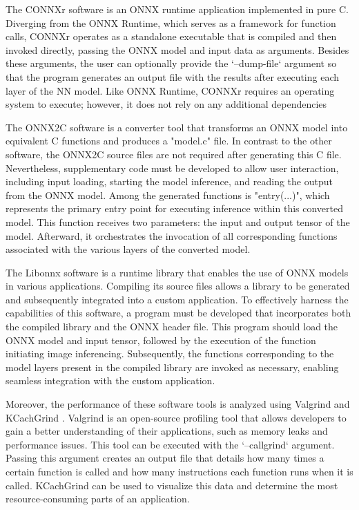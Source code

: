 \documentclass[fleqn,10pt]{olplainarticle}
\begin{document}
The CONNXr software is an ONNX runtime application implemented in pure C. Diverging from the ONNX Runtime, which serves as a framework for function calls, CONNXr operates as a standalone executable that is compiled and then invoked directly, passing the ONNX model and input data as arguments. Besides these arguments, the user can optionally provide the `--dump-file` argument so that the program generates an output file with the results after executing each layer of the NN model. Like ONNX Runtime, CONNXr requires an operating system to execute; however, it does not rely on any additional dependencies

The ONNX2C software is a converter tool that transforms an ONNX model into equivalent C functions and produces a "model.c" file. In contrast to the other software, the ONNX2C source files are not required after generating this C file. Nevertheless, supplementary code must be developed to allow user interaction, including input loading, starting the model inference, and reading the output from the ONNX model. Among the generated functions is "entry(...)", which represents the primary entry point for executing inference within this converted model. This function receives two parameters: the input and output tensor of the model. Afterward, it orchestrates the invocation of all corresponding functions associated with the various layers of the converted model.

The Libonnx software is a runtime library that enables the use of ONNX models in various applications. Compiling its source files allows a library to be generated and subsequently integrated into a custom application. To effectively harness the capabilities of this software, a program must be developed that incorporates both the compiled library and the ONNX header file. This program should load the ONNX model and input tensor, followed by the execution of the function initiating image inferencing. Subsequently, the functions corresponding to the model layers present in the compiled library are invoked as necessary, enabling seamless integration with the custom application.

Moreover, the performance of these software tools is analyzed using Valgrind \cite{nethercoteValgrindProgramSupervision2003} and KCachGrind \cite{weidendorferSequentialPerformanceAnalysis2008}. Valgrind is an open-source profiling tool that allows developers to gain a better understanding of their applications, such as memory leaks and performance issues. This tool can be executed with the `--callgrind` argument. Passing this argument creates an output file that details how many times a certain function is called and how many instructions each function runs when it is called. KCachGrind can be used to visualize this data and determine the most resource-consuming parts of an application.
\end{document}
